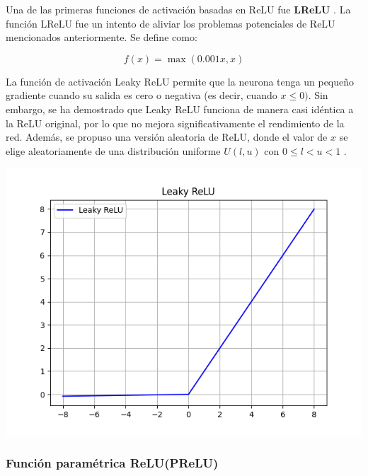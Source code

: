\begin{minipage}{0.6\textwidth}
    Una de las primeras funciones de activación basadas en ReLU fue \textbf{LReLU} \citep{maas2013rectifier}. La función LReLU fue un intento de aliviar los problemas potenciales de ReLU mencionados anteriormente. Se define como:

\begin{equation}
    f(x) = \max(0.001x, x)
\end{equation}

La función de activación Leaky ReLU permite que la neurona tenga un pequeño gradiente cuando su salida es cero o negativa (es decir, cuando $x \leq 0)$. Sin embargo, se ha demostrado que Leaky ReLU funciona de manera casi idéntica a la ReLU original, por lo que no mejora significativamente el rendimiento de la red. Además, se propuso una versión aleatoria de ReLU, donde el valor de $x$ se elige aleatoriamente de una distribución uniforme \( U(l, u) \) con \( 0 \le l < u < 1 \) \citep{apicella2021survey}.
\end{minipage}
\begin{minipage}{0.05\textwidth}
\textbf{ }
\end{minipage}
\begin{minipage}{0.35\textwidth}
    \includegraphics[width=1.1\textwidth]{img/Leaky ReLU.png}
    \label{img: LReLU}
\end{minipage}


\subsubsection*{Función paramétrica ReLU(PReLU)}


